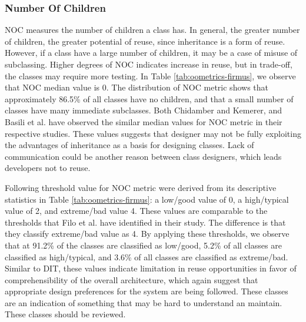 \subsubsection{Number Of Children}
NOC measures the number of children a class has. In general, the greater number of children, the greater potential of reuse, since inheritance is a form of reuse. However, if a class have a large number of children, it may be a case of misuse of subclassing\cite{basili1996validation}. Higher degrees of NOC indicates increase in reuse, but in trade-off, the classes may require more testing. In Table \ref{tab:oometrics-firmus}, we observe that NOC median value is 0. The distribution of NOC metric shows that approximately 86.5\% of all classes have no children, and that a small number of classes have many immediate subclasses. Both Chidamber and Kemerer\cite{chidamber1994metrics}, and Basili et al.\cite{basili1996validation} have observed the similar median values for NOC metric in their respective studies. These values suggests that designer may not be fully exploiting the advantages of inheritance as a basis for designing classes. Lack of communication could be another reason between class designers, which leads developers not to reuse.

Following threshold value for NOC metric were derived from its descriptive statistics in Table \ref{tab:oometrics-firmus}: a low/good value of 0, a high/typical value of 2, and extreme/bad value 4. These values are comparable to the thresholds that Filo et al.\cite{tarcisio} have identified in their study. The difference is that they classify extreme/bad value as 4. By applying these thresholds, we observe that at 91.2\% of the classes are classified as low/good, 5.2\% of all classes are classified as high/typical, and 3.6\% of all classes are classified as extreme/bad. Similar to DIT, these values indicate limitation in reuse opportunities in favor of comprehensibility of the overall architecture, which again suggest that appropriate design preferences for the system are being followed. These classes are an indication of something that may be hard to understand an maintain. These classes should be reviewed.

